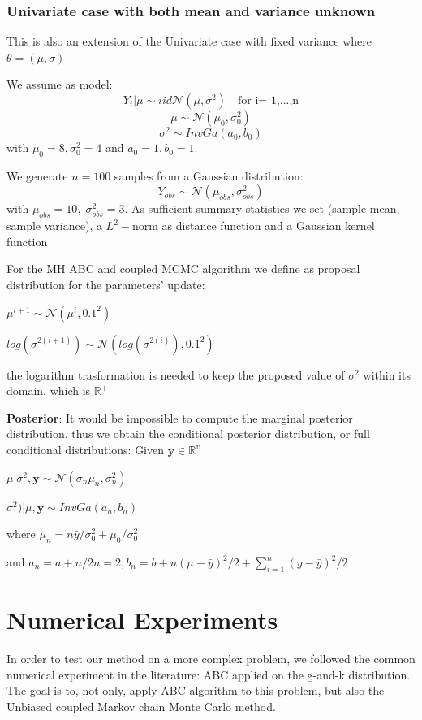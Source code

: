 \documentclass {article}
\begin{document}
\subsubsection{Univariate case with both mean and variance unknown}

This is also an extension of the Univariate case with fixed variance where $\theta = (\mu,\sigma)$

We assume as model:
$$ Y_i | \mu \sim{iid} \mathcal{N}(\mu, \sigma ^2) \quad \text{for i= 1,...,n} $$
$$ \mu  \sim \mathcal{N}(\mu_0, \sigma_0^2)$$
$$ \sigma^2 \sim InvGa(a_0,b_0)
$$
with $\mu_0=8, \sigma_0^2=4$ and $a_0=1, b_0=1$.

We generate $n= 100$ samples from a Gaussian distribution:
$$
Y_{obs} \sim \mathcal{N}(\mu_{obs}, \sigma_{obs} ^2)
$$
with
$
\mu_{obs} = 10, \;
\sigma_{obs} ^2 = 3
$.
As sufficient summary statistics we set (sample mean, sample variance), a $L^2-$norm as distance function and a Gaussian kernel function

	
For the MH ABC and coupled MCMC algorithm we define as proposal distribution for the parameters' update:
\begin{center}
	$ \mu^{i+1} \sim	\mathcal{N}( \mu^{i}, 0.1^2) $
	
	$ log(\sigma^{2(i+1)}) \sim \mathcal{N}( log(\sigma^{2(i)}), 0.1^2) $
\end{center}
the logarithm trasformation is needed to keep the proposed value of $ \sigma^2$ within its domain, 
which is $\mathbb{R^{+}}$

	
\textbf{Posterior}:
It would be impossible to compute the marginal posterior distribution, thus we obtain the conditional posterior distribution, or full conditional distributions:
Given $\mathbf{y} \in \mathbb{R^{n}} $
\begin{center}
	
	$ \mu| \sigma^2,\mathbf{y} \sim	\mathcal{N}( \sigma_n\mu_n, \sigma_n^2) $
	
	$ \sigma^{2})| \mu,\mathbf{y} \sim InvGa( a_n,b_n) $
	
	where $ \mu_n= n\bar y/\sigma_0^2 + \mu_0/\sigma_0^2$
\end{center}		
and $a_n= a + n/2n=2, b_n=b + n(\mu-\bar y)^2/2 +	\sum_{i=1}^n (y-\bar y)^2/2 $


	\section{Numerical Experiments}
In order to test our method on a more complex problem, we followed the common numerical experiment in the literature: ABC applied on the g-and-k distribution.
The goal is to, not only, apply ABC algorithm to this problem, but also the Unbiased coupled Markov chain Monte Carlo method.
\end{document}
